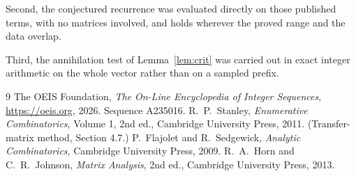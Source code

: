 \documentclass[11pt,a4paper]{article}
\theoremstyle{plain}
\theoremstyle{definition}
\begin{document}
Second, the conjectured recurrence was evaluated directly on those published terms, with no
matrices involved, and holds wherever the proved range and the data overlap.

Third, the annihilation test of Lemma~\ref{lem:crit} was carried out in exact integer
arithmetic on the whole vector rather than on a sampled prefix.

\begin{thebibliography}{9}
 The OEIS Foundation, \emph{The On-Line Encyclopedia of Integer
Sequences}, \url{https://oeis.org}, 2026. Sequence A235016.
 R.~P.~Stanley, \emph{Enumerative Combinatorics}, Volume 1, 2nd ed.,
Cambridge University Press, 2011. (Transfer-matrix method, Section 4.7.)
 P.~Flajolet and R.~Sedgewick, \emph{Analytic Combinatorics}, Cambridge
University Press, 2009.
 R.~A.~Horn and C.~R.~Johnson, \emph{Matrix Analysis}, 2nd ed., Cambridge
University Press, 2013.
\end{thebibliography}
\end{document}
